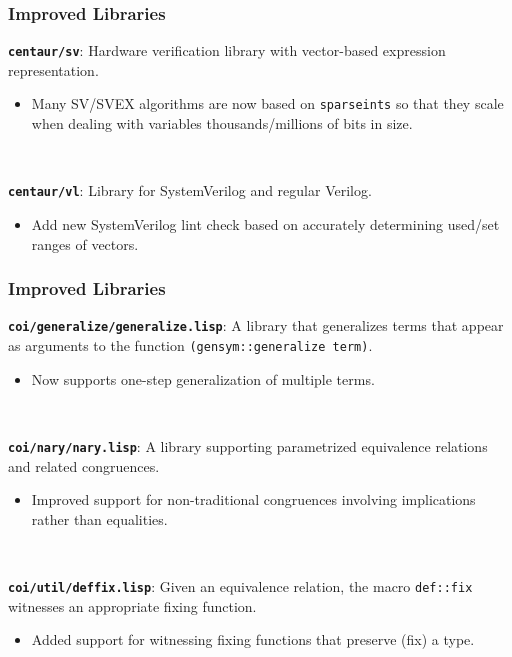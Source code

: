\documentclass{beamer}
\newcommand{\code}[1]{\texttt{#1}}
\newcommand{\bookpath}[1]{\textbf{\code{#1}}}
\newcommand{\implibtitle}{\frametitle{Improved Libraries}}
\begin{document}

\begin{frame}

\implibtitle

\bookpath{centaur/sv}:
Hardware verification library with vector-based expression representation.
\begin{itemize}
\item
Many SV/SVEX algorithms are now based on \code{sparseints} so that they scale
when dealing with variables thousands/millions of bits in size.
\end{itemize}

\

\bookpath{centaur/vl}:
Library for SystemVerilog and regular Verilog.
\begin{itemize}
\item
Add new SystemVerilog lint check based on accurately determining
used/set ranges of vectors.
\end{itemize}

\end{frame}


\begin{frame}

\implibtitle

\bookpath{coi/generalize/generalize.lisp}:
A library that generalizes terms that appear as arguments to the
function \code{(gensym::generalize term)}.
\begin{itemize}
\item
Now supports one-step generalization of multiple terms.
\end{itemize}

\

\bookpath{coi/nary/nary.lisp}:
A library supporting parametrized equivalence relations and related congruences.
\begin{itemize}
\item
Improved support for non-traditional congruences involving
implications rather than equalities.
\end{itemize}

\

\bookpath{coi/util/deffix.lisp}:
Given an equivalence relation, the macro \code{def::fix} witnesses an
appropriate fixing function.
\begin{itemize}
\item
Added support for witnessing fixing functions that preserve (fix) a type.
\end{itemize}

\end{frame}
\end{document}
